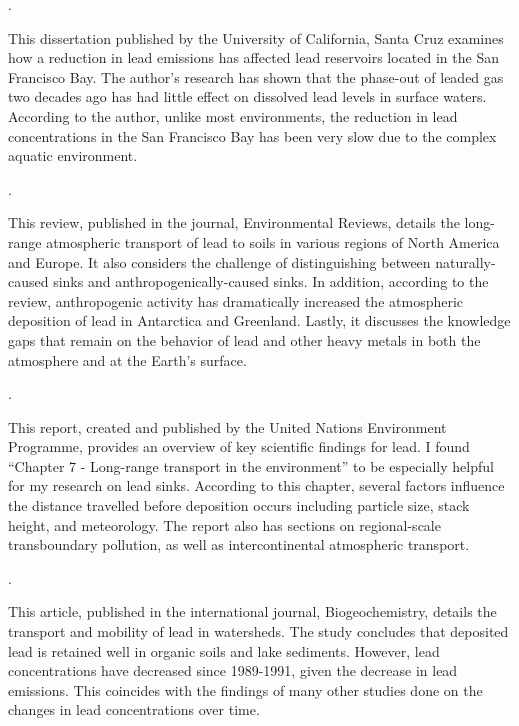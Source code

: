 \documentclass{article}\usepackage[]{graphicx}\usepackage[]{color}
\begin{document}
\medskip

\noindent {}.

\medskip

This dissertation published by the University of California, Santa Cruz examines how a reduction in lead emissions has affected lead reservoirs located in the San Francisco Bay. The author’s research has shown that the phase-out of leaded gas two decades ago has had little effect on dissolved lead levels in surface waters. According to the author, unlike most environments, the reduction in lead concentrations in the San Francisco Bay has been very slow due to the complex aquatic environment.

\medskip

\noindent {}.

\medskip

This review, published in the journal, Environmental Reviews, details the long-range atmospheric transport of lead to soils in various regions of North America and Europe. It also considers the challenge of distinguishing between naturally-caused sinks and anthropogenically-caused sinks. In addition, according to the review, anthropogenic activity has dramatically increased the atmospheric deposition of lead in Antarctica and Greenland. Lastly, it discusses the knowledge gaps that remain on the behavior of lead and other heavy metals in both the atmosphere and at the Earth’s surface.

\medskip

\noindent {}.

\medskip

This report, created and published by the United Nations Environment Programme, provides an overview of key scientific findings for lead. I found “Chapter 7 - Long-range transport in the environment” to be especially helpful for my research on lead sinks. According to this chapter, several factors influence the distance travelled before deposition occurs including particle size, stack height, and meteorology. The report also has sections on regional-scale transboundary pollution, as well as intercontinental atmospheric transport.

\medskip

\noindent {}.

\medskip

This article, published in the international journal, Biogeochemistry, details the transport and mobility of lead in watersheds. The study concludes that deposited lead is retained well in organic soils and lake sediments. However, lead concentrations have decreased since 1989-1991, given the decrease in lead emissions. This coincides with the findings of many other studies done on the changes in lead concentrations over time. 
\end{document}
